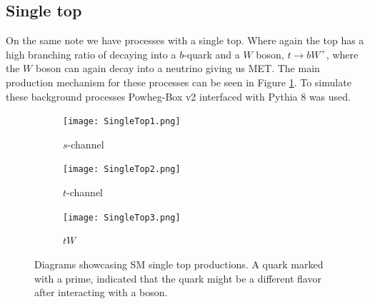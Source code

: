 \documentclass[12pt, a4paper]{book}
\begin{document}
\subsection{Single top}
On the same note we have processes with a single top. Where again the top has a high branching ratio of decaying into a $b$-quark and a $W$ boson, $t\rightarrow bW^+$, where the $W$ boson can again decay into a neutrino giving 
us MET. The main production mechanism for these processes can be seen in Figure \ref{fig:T_BKG}. To simulate these background processes Powheg-Box v2 \cite{PowHeg} interfaced with Pythia 8 \cite{Pythia} was used.
\begin{figure}[!ht]
    \centering
    \begin{subfigure}[b]{0.3\textwidth}
        \centering
        \texttt{[image: SingleTop1.png]}
        \caption{$s$-channel}
    \end{subfigure}
    \hfill
    \begin{subfigure}[b]{0.3\textwidth}
        \centering
        \texttt{[image: SingleTop2.png]}
        \caption{$t$-channel}
    \end{subfigure}
    \hfill
    \begin{subfigure}[b]{0.3\textwidth}
        \centering
        \texttt{[image: SingleTop3.png]}
        \caption{$tW$}
    \end{subfigure}
    \caption[Single Top production]{Diagrams showcasing SM single top productions.  A quark marked with a prime, indicated that the quark might be a different flavor after interacting with a boson.}\label{fig:T_BKG}
\end{figure}
\end{document}
